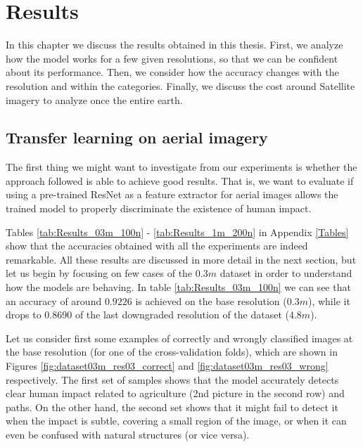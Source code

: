 
\chapter{Results} 

\label{Chapter5}


In this chapter we discuss the results obtained in this thesis. First, we analyze how the model works for a few given resolutions, so that we can be confident about its performance. Then, we consider how the accuracy changes with the resolution and within the categories. Finally, we discuss the cost around Satellite imagery to analyze once the entire earth. 

\section{Transfer learning on aerial imagery}

The first thing we might want to investigate from our experiments is whether the approach followed is able to achieve good results. That is, we want to evaluate if using a pre-trained ResNet as a feature extractor for aerial images allows the trained model to properly discriminate the existence of human impact. 

Tables \ref{tab:Results_03m_100n} - \ref{tab:Results_1m_200n} in Appendix \ref{Tables} show that the accuracies obtained with all the experiments are indeed remarkable. All these results are discussed in more detail in the next section, but let us begin by focusing on few cases of the $0.3m$ dataset in order to understand how the models are behaving. In table \ref{tab:Results_03m_100n} we can see that an accuracy of around $0.9226$ is achieved on the base resolution ($0.3m$), while it drops to $0.8690$ of the last downgraded resolution of the dataset ($4.8m$).

Let us consider first some examples of correctly and wrongly classified images at the base resolution (for one of the cross-validation folds), which are shown in Figures \ref{fig:dataset03m_res03_correct} and \ref{fig:dataset03m_res03_wrong} respectively. The first set of samples shows that the model accurately detects clear human impact related to agriculture (2nd picture in the second row) and paths. On the other hand, the second set shows that it might fail to detect it when the impact is subtle, covering a small region of the image, or when it can even be confused with natural structures (or vice versa).

